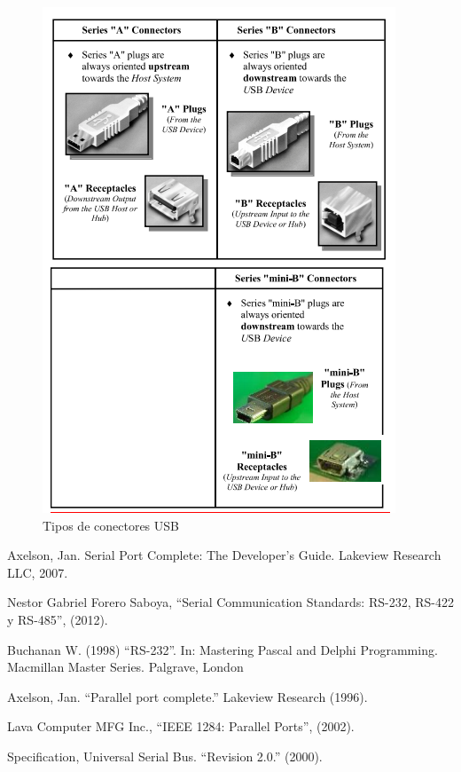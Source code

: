 \documentclass[a4paper,12pt]{article}
\begin{document}
\begin{enumerate}
 \begin{figure}[H]
   \centering
   \includegraphics[scale = 0.6]{6.png}
   \caption{Tipos de conectores USB \cite{usb}}
   \label{fig:usb}
 \end{figure}
 
\end{enumerate}


\begin{thebibliography}{1}

Axelson, Jan. Serial Port Complete: The Developer's Guide. Lakeview Research LLC, 2007.

Nestor Gabriel Forero Saboya, ``Serial Communication Standards: RS-232, RS-422 y RS-485'', (2012).

Buchanan W. (1998) ``RS-232''. In: Mastering Pascal and Delphi Programming. Macmillan Master Series. Palgrave, London

Axelson, Jan. ``Parallel port complete.'' Lakeview Research (1996).

Lava Computer MFG Inc., ``IEEE 1284: Parallel Ports'', (2002).

Specification, Universal Serial Bus. ``Revision 2.0.'' (2000).

\end{thebibliography}
\end{document}
